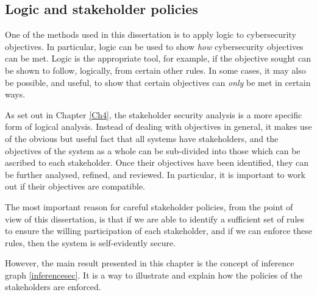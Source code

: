 \subsection{Logic and stakeholder policies}
One of the methods used in this dissertation is to apply logic to cybersecurity objectives. In particular, logic can be used to show {\em how} cybersecurity objectives can be met. Logic is the appropriate tool, for example, if the objective sought can be shown to follow, logically, from certain other rules. In some cases, it may also be possible, and useful, to show that certain objectives can {\em only} be met in certain ways.

As set out in Chapter \ref{Ch4}, the stakeholder security analysis is a more specific form of logical analysis. Instead of dealing with objectives in general, it makes use of the obvious but useful fact that all systems have stakeholders, and the objectives of the system as a whole can be sub-divided into those which can be ascribed to each stakeholder. Once their objectives have been identified, they can be further analysed, refined, and reviewed. In particular, it is important to work out if their objectives are compatible.

The most important reason for careful stakeholder policies, from the point of view of this dissertation, is that if we are able to identify a sufficient set of rules to ensure the willing participation of each stakeholder, and if we can enforce these rules, then the system is self-evidently secure.

However, the main result presented in this chapter is the concept of inference graph \ref{inferencesec}. It is a way to illustrate and explain how the policies of the stakeholders are enforced. 


